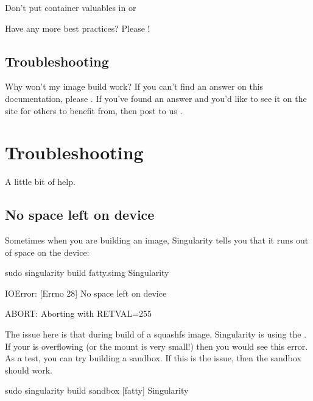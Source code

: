 \documentclass[letterpaper,10pt,english]{sphinxmanual}
\begin{document}
Don’t put container valuables in  or 

Have any more best practices? Please !


\section{Troubleshooting}
\label{\detokenize{singularity_and_docker:troubleshooting}}
Why won’t my image build work? If you can’t find an answer on this documentation,
please . If you’ve found an answer and you’d like to
see it on the site for others to benefit from, then post to us
.


\chapter{Troubleshooting}
\label{\detokenize{troubleshooting:troubleshooting}}\label{\detokenize{troubleshooting::doc}}
A little bit of help.


\section{No space left on device}
\label{\detokenize{troubleshooting:no-space-left-on-device}}
Sometimes when you are building an image, Singularity tells you that
it runs out of space on the device:

%
\begin{sphinxVerbatim}[commandchars=\\\{\}]
sudo singularity build fatty.simg Singularity

IOError: [Errno 28] No space left on device

ABORT: Aborting with RETVAL=255
\end{sphinxVerbatim}

The issue here is that during build of a squashfs image, Singularity is
using the  . If your  is overflowing (or the mount is very small!) then
you would see this error. As a test, you can try building a sandbox. If this is the issue, then the sandbox should work.

%
\begin{sphinxVerbatim}[commandchars=\\\{\}]
sudo singularity build \PYGZhy{}\PYGZhy{}sandbox [fatty] Singularity
\end{sphinxVerbatim}
\end{document}
